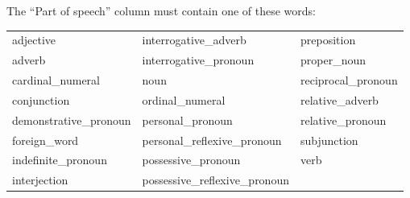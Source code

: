 \documentclass[11pt,oneside,a4paper]{memoir}
\begin{document}
The ``Part of speech'' column must contain one of these words:

\begin{center}
  \begin{tabular}{lll}
    adjective              & interrogative\_adverb          & preposition         \\ 
    adverb                 & interrogative\_pronoun         & proper\_noun        \\ 
    cardinal\_numeral      & noun                           & reciprocal\_pronoun \\ 
    conjunction            & ordinal\_numeral               & relative\_adverb    \\ 
    demonstrative\_pronoun & personal\_pronoun              & relative\_pronoun   \\ 
    foreign\_word          & personal\_reflexive\_pronoun   & subjunction         \\ 
    indefinite\_pronoun    & possessive\_pronoun            & verb                \\ 
    interjection           & possessive\_reflexive\_pronoun &                     \\ 
  \end{tabular}
\end{center}


\printindex
\end{document}
